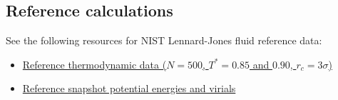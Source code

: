 \documentclass[aip,jcp,preprint,superscriptaddress,floatfix]{revtex4-1}
\begin{document}
\subsection{Reference calculations}

See the following resources for NIST Lennard-Jones fluid reference data:
\begin{itemize}
\item \href{https://mmlapps.nist.gov/srs/LJ_PURE/mc.htm}{Reference thermodynamic data ($N=500$, $T^*=0.85$ and $0.90$, $r_c = 3\sigma$)}
\item \href{https://www.nist.gov/mml/csd/chemical-informatics-research-group/lennard-jones-fluid-reference-calculations}{Reference snapshot potential energies and virials}
\end{itemize}

\newpage
%


\end{document}
